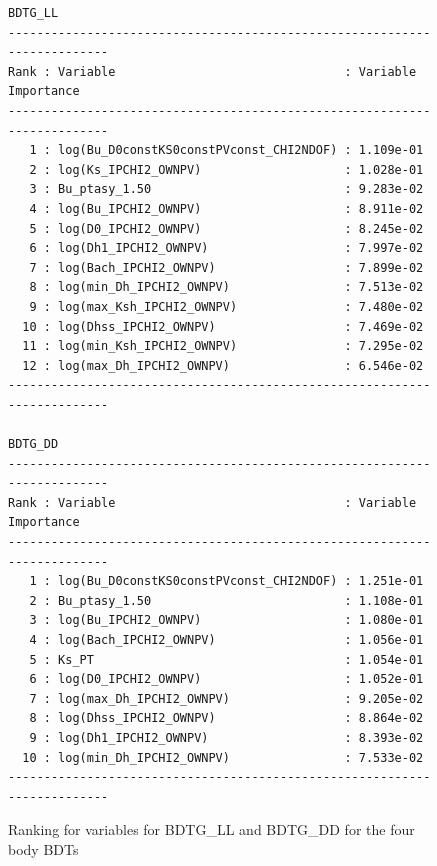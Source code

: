 \begin{figure}
\begin{verbatim}
BDTG_LL
-------------------------------------------------------------------------
Rank : Variable                                : Variable Importance
-------------------------------------------------------------------------
   1 : log(Bu_D0constKS0constPVconst_CHI2NDOF) : 1.109e-01
   2 : log(Ks_IPCHI2_OWNPV)                    : 1.028e-01
   3 : Bu_ptasy_1.50                           : 9.283e-02
   4 : log(Bu_IPCHI2_OWNPV)                    : 8.911e-02
   5 : log(D0_IPCHI2_OWNPV)                    : 8.245e-02
   6 : log(Dh1_IPCHI2_OWNPV)                   : 7.997e-02
   7 : log(Bach_IPCHI2_OWNPV)                  : 7.899e-02
   8 : log(min_Dh_IPCHI2_OWNPV)                : 7.513e-02
   9 : log(max_Ksh_IPCHI2_OWNPV)               : 7.480e-02
  10 : log(Dhss_IPCHI2_OWNPV)                  : 7.469e-02
  11 : log(min_Ksh_IPCHI2_OWNPV)               : 7.295e-02
  12 : log(max_Dh_IPCHI2_OWNPV)                : 6.546e-02
-------------------------------------------------------------------------

BDTG_DD
-------------------------------------------------------------------------
Rank : Variable                                : Variable Importance
-------------------------------------------------------------------------
   1 : log(Bu_D0constKS0constPVconst_CHI2NDOF) : 1.251e-01
   2 : Bu_ptasy_1.50                           : 1.108e-01
   3 : log(Bu_IPCHI2_OWNPV)                    : 1.080e-01
   4 : log(Bach_IPCHI2_OWNPV)                  : 1.056e-01
   5 : Ks_PT                                   : 1.054e-01
   6 : log(D0_IPCHI2_OWNPV)                    : 1.052e-01
   7 : log(max_Dh_IPCHI2_OWNPV)                : 9.205e-02
   8 : log(Dhss_IPCHI2_OWNPV)                  : 8.864e-02
   9 : log(Dh1_IPCHI2_OWNPV)                   : 8.393e-02
  10 : log(min_Dh_IPCHI2_OWNPV)                : 7.533e-02
-------------------------------------------------------------------------
\end{verbatim}
\caption{Ranking for variables for BDTG\_LL and BDTG\_DD for the four body BDTs}
\label{variableranking4body}
\end{figure}

